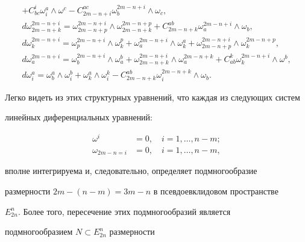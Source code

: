 \begin{equation}
\begin{array}{l}
+C^i_{bc}\omega^a_i\wedge \omega^c-


C^{ac}_{2m-n+i}\omega^{2m-n+i}_b\wedge \omega_c,\\


%


d\omega^{2m-n+i}_{2m-n+k}=\omega^{2m-n+i}_{2m-n+p}\wedge \omega^{2m-


n+p}_{2m-n+k}+C^{ab}_{2m-n+k} \omega^{2m-n+i}_a\wedge \omega_b,\\


%


d\omega^{2m-n+i}_k=\omega^{2m-n+i}_p\wedge \omega^p_k+\omega^{2m-


n+i}_a\wedge \omega^a_k+\omega^{2m-n+i}_{2m-n+p}\wedge \omega^{2m-


n+p}_k,\\


%


d\omega^{2m-n+i}_a=\omega^{2m-n+i}_b\wedge \omega^b_a+\omega^{2m-


n+i}_{2m-n+k}\wedge \omega^{2m-n+k}_a+


C^k_{ab}\omega^{2m-n+i}_k\wedge \omega^b,\\


%


d\omega^a_i=\omega^a_b\wedge \omega^b_i+\omega^a_k\wedge \omega^k_i


-C^{ab}_{2m-n+k}\omega^{2m-n+k}_i\wedge \omega_b.


\end{array}


\end{equation}


Легко видеть из этих структурных уравнений, что каждая из следующих систем


линейных диференциальных уравнений:


\begin{align*}


\omega^i&=0,\quad i=1, \dotsc, n - m;\\


\omega_{2m-n=i}&=0,\quad i=1, \dotsc, n - m,


\end{align*}


вполне интегрируема и, следовательно, определяет подмногообразие


размерности $2m - (n - m) = 3m - n$ в псевдоевклидовом пространстве


$E^n_{2n}$. Более того, пересечение этих подмногообразий является


подмногообразием $N\subset E^n_{2n}$ размерности


